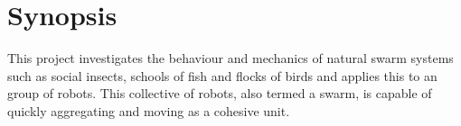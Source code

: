 \chapter*{Synopsis}


This project investigates the behaviour and mechanics of natural swarm systems such as social insects, schools of fish and flocks of birds and applies this to an group of robots. This collective of robots, also termed a swarm, is capable of quickly aggregating and moving as a cohesive unit.